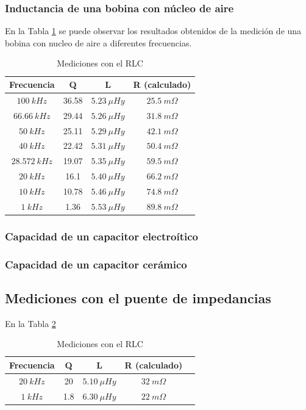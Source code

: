 \documentclass[a4paper,10pt]{article}
\begin{document}
		\subsubsection{Inductancia de una bobina con n\'ucleo de aire}
		En la Tabla \ref{tabRLCbobina} se puede observar los resultados obtenidos de la medici\'on de una bobina con nucleo de aire a diferentes frecuencias.
		\begin{table}[!htp]
					\centering
					\begin{tabular}{|c|c|c|c|}
						\hline
			    		Frecuencia & Q & L  & R (calculado) \\
						\hline
						$100~kHz$& 36.58 & $5.23~\mu Hy$ &$ 25.5~m\Omega$ \\
						\hline
						$66.66~kHz$& 29.44 & $5.26~\mu Hy$ &$ 31.8~m\Omega$ \\
						\hline
						$50~kHz$& 25.11 & $5.29~\mu Hy$ &$ 42.1~m\Omega$ \\
						\hline  
						$40~kHz$& 22.42 & $5.31~\mu Hy$ &$ 50.4~m\Omega$ \\
						\hline  										
						$28.572~kHz$& 19.07 & $5.35~\mu Hy$ &$ 59.5~m\Omega$ \\
						\hline
						$20~kHz$& 16.1 & $5.40~\mu Hy$ &$ 66.2~m\Omega$ \\
						\hline  
						$10~kHz$& 10.78 & $5.46~\mu Hy$ &$ 74.8~m\Omega$ \\
						\hline 										
						$1~kHz$& 1.36 & $5.53~\mu Hy$ &$ 89.8~m\Omega$ \\
						\hline 	  
					\end{tabular}
					\caption{Mediciones con el RLC} \label{tabRLCbobina}
				\end{table}
						
		\subsubsection{Capacidad de un capacitor electro\'itico}	
		\subsubsection{Capacidad de un capacitor cer\'amico}
		
		\subsection{Mediciones con el puente de impedancias}
		En la Tabla \ref{tabPUENTEbobina}
		\begin{table}[!htp]
					\centering
					\begin{tabular}{|c|c|c|c|c|}
						\hline
			    		Frecuencia & Q & L  & R (calculado) \\
						\hline
						$20~kHz$& 20 & $5.10~\mu Hy$ &$ 32~m\Omega$ \\
						\hline
						$1~kHz$& 1.8 & $6.30~\mu Hy$ &$ 22~m\Omega$ \\
						\hline	  
					\end{tabular}
					\caption{Mediciones con el RLC} \label{tabPUENTEbobina}
				\end{table}	
\end{document}
